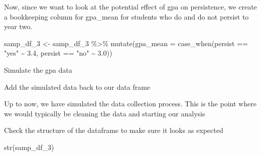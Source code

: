 \documentclass[
]{book}
\newenvironment{Shaded}{\begin{snugshade}}{\end{snugshade}}
\newcommand{\AttributeTok}[1]{\textcolor[rgb]{0.77,0.63,0.00}{#1}}
\newcommand{\DecValTok}[1]{\textcolor[rgb]{0.00,0.00,0.81}{#1}}
\newcommand{\FloatTok}[1]{\textcolor[rgb]{0.00,0.00,0.81}{#1}}
\newcommand{\FunctionTok}[1]{\textcolor[rgb]{0.00,0.00,0.00}{#1}}
\newcommand{\NormalTok}[1]{#1}
\newcommand{\OtherTok}[1]{\textcolor[rgb]{0.56,0.35,0.01}{#1}}
\newcommand{\SpecialCharTok}[1]{\textcolor[rgb]{0.00,0.00,0.00}{#1}}
\newcommand{\StringTok}[1]{\textcolor[rgb]{0.31,0.60,0.02}{#1}}
\begin{document}
Now, since we want to look at the potential effect of gpa on persistence, we create a bookkeeping column for gpa\_mean for students who do and do not persist to year two.

\begin{Shaded}
\begin{Highlighting}[]
\NormalTok{samp\_df\_3 }\OtherTok{\textless{}{-}}\NormalTok{ samp\_df\_3 }\SpecialCharTok{\%\textgreater{}\%} 
  \FunctionTok{mutate}\NormalTok{(}\AttributeTok{gpa\_mean =} \FunctionTok{case\_when}\NormalTok{(persist }\SpecialCharTok{==} \StringTok{"yes"} \SpecialCharTok{\textasciitilde{}} \FloatTok{3.4}\NormalTok{,}
\NormalTok{                              persist }\SpecialCharTok{==} \StringTok{"no"} \SpecialCharTok{\textasciitilde{}} \FloatTok{3.0}\NormalTok{))}
\end{Highlighting}
\end{Shaded}

Simulate the gpa data

\begin{Shaded}
\end{Shaded}

Add the simulated data back to our data frame

\begin{Shaded}
\end{Shaded}

Up to now, we have simulated the data collection process. This is the point where we would typically be cleaning the data and starting our analysis

Check the structure of the dataframe to make sure it looks as expected

\begin{Shaded}
\begin{Highlighting}[]
\FunctionTok{str}\NormalTok{(samp\_df\_3)}
\end{Highlighting}
\end{Shaded}
\end{document}
